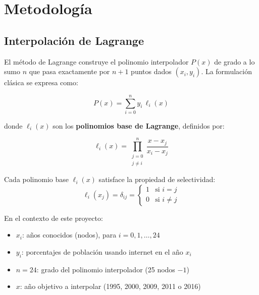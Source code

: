 \documentclass[12pt, letterpaper]{article}
\begin{document}
\section{Metodología}\label{sec:metodologia}

\subsection{Interpolación de Lagrange}\label{subsec:lagrange}

El método de Lagrange construye el polinomio interpolador $P(x)$ de grado a lo sumo $n$ que pasa exactamente por $n+1$ puntos dados $(x_i, y_i)$. La formulación clásica se expresa como:

\begin{equation}\label{eq:lagrange}
P(x) = \sum_{i=0}^{n} y_i \, \ell_i(x)
\end{equation}

donde $\ell_i(x)$ son los \textbf{polinomios base de Lagrange}, definidos por:

\begin{equation}\label{eq:base-lagrange}
\ell_i(x) = \prod_{\substack{j=0 \\ j \neq i}}^{n} \frac{x - x_j}{x_i - x_j}
\end{equation}

Cada polinomio base $\ell_i(x)$ satisface la propiedad de selectividad:
\begin{equation}
\ell_i(x_j) = \delta_{ij} =
\begin{cases}
1 & \text{si } i = j \\
0 & \text{si } i \neq j
\end{cases}
\end{equation}

En el contexto de este proyecto:
\begin{itemize}[leftmargin=2cm]
    \item $x_i$: años conocidos (nodos), para $i = 0, 1, \ldots, 24$
    \item $y_i$: porcentajes de población usando internet en el año $x_i$
    \item $n = 24$: grado del polinomio interpolador (25 nodos $- 1$)
    \item $x$: año objetivo a interpolar (1995, 2000, 2009, 2011 o 2016)
\end{itemize}
\end{document}
